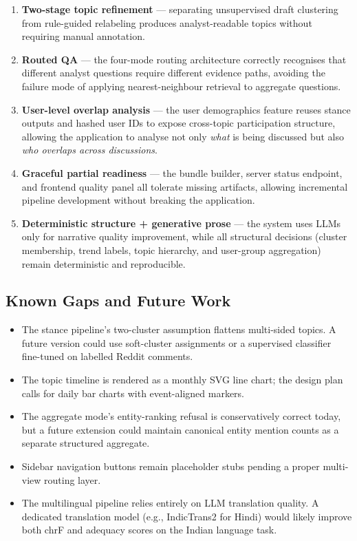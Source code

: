 \documentclass[11pt,a4paper]{article}
\begin{document}
\begin{enumerate}
  \item \textbf{Two-stage topic refinement} --- separating unsupervised draft clustering from rule-guided relabeling produces analyst-readable topics without requiring manual annotation.
  \item \textbf{Routed QA} --- the four-mode routing architecture correctly recognises that different analyst questions require different evidence paths, avoiding the failure mode of applying nearest-neighbour retrieval to aggregate questions.
  \item \textbf{User-level overlap analysis} --- the user demographics feature reuses stance outputs and hashed user IDs to expose cross-topic participation structure, allowing the application to analyse not only \textit{what} is being discussed but also \textit{who overlaps across discussions}.
  \item \textbf{Graceful partial readiness} --- the bundle builder, server status endpoint, and frontend quality panel all tolerate missing artifacts, allowing incremental pipeline development without breaking the application.
  \item \textbf{Deterministic structure + generative prose} --- the system uses LLMs only for narrative quality improvement, while all structural decisions (cluster membership, trend labels, topic hierarchy, and user-group aggregation) remain deterministic and reproducible.
\end{enumerate}

\subsection{Known Gaps and Future Work}

\begin{itemize}
  \item The stance pipeline's two-cluster assumption flattens multi-sided topics. A future version could use soft-cluster assignments or a supervised classifier fine-tuned on labelled Reddit comments.
  \item The topic timeline is rendered as a monthly SVG line chart; the design plan calls for daily bar charts with event-aligned markers.
  \item The aggregate mode's entity-ranking refusal is conservatively correct today, but a future extension could maintain canonical entity mention counts as a separate structured aggregate.
  \item Sidebar navigation buttons remain placeholder stubs pending a proper multi-view routing layer.
  \item The multilingual pipeline relies entirely on LLM translation quality. A dedicated translation model (e.g., IndicTrans2 for Hindi) would likely improve both chrF and adequacy scores on the Indian language task.
\end{itemize}
\end{document}
